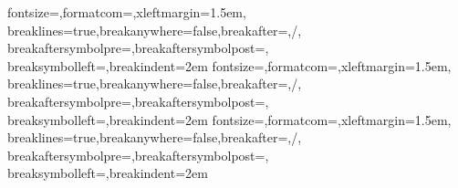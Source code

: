 %
  {fontsize=\small,formatcom=\codefontfamily,xleftmargin=1.5em,
   breaklines=true,breakanywhere=false,breakafter={,/},
   breakaftersymbolpre={},breakaftersymbolpost={},
   breaksymbolleft={},breakindent=2em}
%
  {fontsize=\small,formatcom=\literalfontfamily,xleftmargin=1.5em,
   breaklines=true,breakanywhere=false,breakafter={,/},
   breakaftersymbolpre={},breakaftersymbolpost={},
   breaksymbolleft={},breakindent=2em}
%
  {fontsize=\small,formatcom=,xleftmargin=1.5em,
   breaklines=true,breakanywhere=false,breakafter={,/},
   breakaftersymbolpre={},breakaftersymbolpost={},
   breaksymbolleft={},breakindent=2em}
